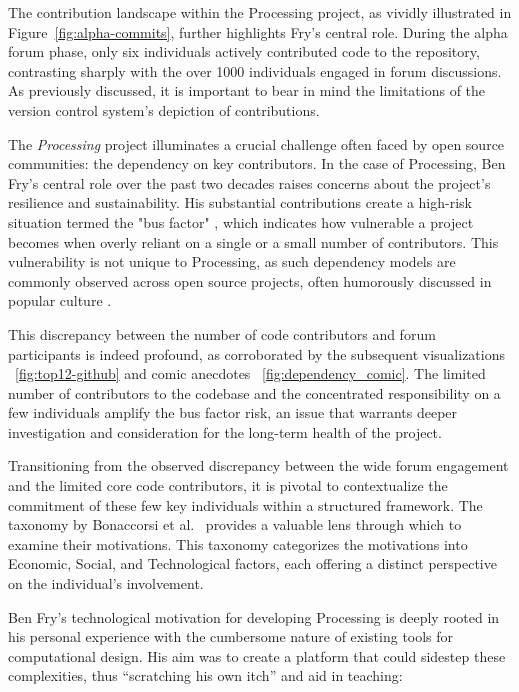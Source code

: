 The contribution landscape within the Processing project, as vividly illustrated in Figure~\ref{fig:alpha-commits}, further highlights Fry's central role. During the alpha forum phase, only six individuals actively contributed code to the repository, contrasting sharply with the over 1000 individuals engaged in forum discussions. As previously discussed, it is important to bear in mind the limitations of the version control system's depiction of contributions.

The \textit{Processing} project illuminates a crucial challenge often faced by open source communities: the dependency on key contributors. In the case of Processing, Ben Fry's central role over the past two decades raises concerns about the project's resilience and sustainability. His substantial contributions create a high-risk situation termed the "bus factor" \parencite{BusFactor2023}, which indicates how vulnerable a project becomes when overly reliant on a single or a small number of contributors. This vulnerability is not unique to Processing, as such dependency models are commonly observed across open source projects, often humorously discussed in popular culture \parencite{munroeDependency2020}.

This discrepancy between the number of code contributors and forum participants is indeed profound, as corroborated by the subsequent visualizations ~\ref{fig:top12-github} and comic anecdotes ~\ref{fig:dependency_comic}. The limited number of contributors to the codebase and the concentrated responsibility on a few individuals amplify the bus factor risk, an issue that warrants deeper investigation and consideration for the long-term health of the project.

Transitioning from the observed discrepancy between the wide forum engagement and the limited core code contributors, it is pivotal to contextualize the commitment of these few key individuals within a structured framework. The taxonomy by Bonaccorsi et al.~\cite{bonaccorsiComparingMotivationsIndividual2006} provides a valuable lens through which to examine their motivations. This taxonomy categorizes the motivations into Economic, Social, and Technological factors, each offering a distinct perspective on the individual's involvement.

Ben Fry’s technological motivation for developing Processing is deeply rooted in his personal experience with the cumbersome nature of existing tools for computational design. His aim was to create a platform that could sidestep these complexities, thus “scratching his own itch” and aid in teaching:

